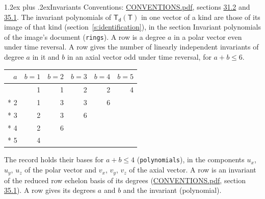 \documentclass[10pt,a4paper]{article}
\makeatletter
\renewcommand\section{\@startsection{section}{1}{\z@}{-3ex plus -1ex minus -.2ex}%
  {1.2ex plus .2ex}{\normalfont\large\sffamily\bfseries\color{parttitle}}}
\numberwithin{equation}{section}
\newcommand{\grp}[1]{\mathsf{#1}}
\makeatother
\begin{document}
\section{Invariants}\label{s:invariants}
Conventions: \href{../../CONVENTIONS.pdf}{CONVENTIONS.pdf}, sections \href{../../CONVENTIONS.pdf\#conv.31.2}{31.2} and \href{../../CONVENTIONS.pdf\#conv.35.1}{35.1}.
The invariant polynomials of $\grp{T_{d}}(\grp{T})$ in one vector of a kind are those of its image of that kind (section~\ref{s:identification}), in the section Invariant polynomials of the image's document (\texttt{rings}).
\leavevmode\label{n:index.degree.polar}\label{n:index.degree.axial}A row is a degree $a$ in a polar vector even under time reversal. A row gives the number of linearly independent invariants of degree $a$ in it and $b$ in an axial vector odd under time reversal, for $a + b \le 6$.
{\small\begin{longtable}{@{}rrrrrr@{}}\toprule
$a$ & $b = 1$ & $b = 2$ & $b = 3$ & $b = 4$ & $b = 5$\\\midrule\endhead
\bottomrule\endfoot\endlastfoot
1 & 1 & 1 & 2 & 2 & 4\\*
2 & 1 & 3 & 3 & 6 & \\*
3 & 2 & 3 & 6 &  & \\*
4 & 2 & 6 &  &  & \\*
5 & 4 &  &  &  & \\
\bottomrule\end{longtable}}
\leavevmode\label{n:local.component.polar}\label{n:local.component.axial}The record holds their bases for $a + b \le 4$ (\texttt{polynomials}), in the components $u_{x}$, $u_{y}$, $u_{z}$ of the polar vector and $v_{x}$, $v_{y}$, $v_{z}$ of the axial vector. \label{n:head.polynomial}A row is an invariant of the reduced row echelon basis of its degrees (\href{../../CONVENTIONS.pdf}{CONVENTIONS.pdf}, section \href{../../CONVENTIONS.pdf\#conv.35.1}{35.1}). A row gives its degrees $a$ and $b$ and the invariant (polynomial).
\end{document}
